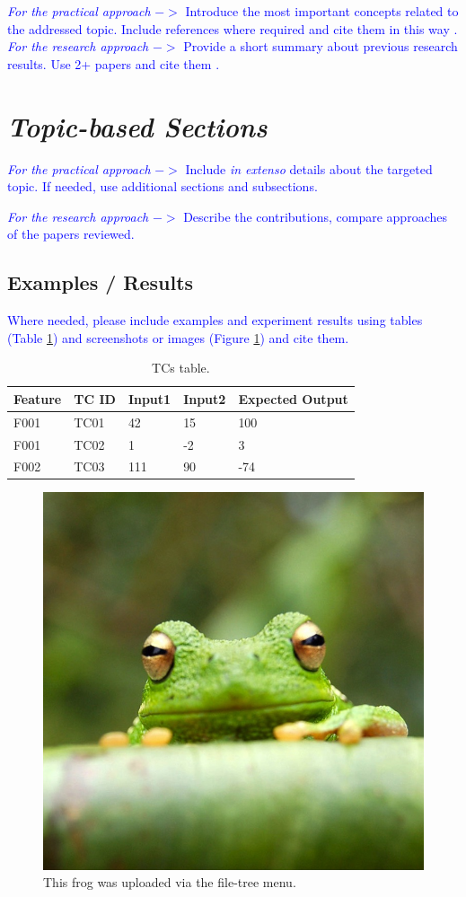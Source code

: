 \documentclass{article}
\begin{document}
\textcolor{blue}{\textit{For the practical approach} $->$ Introduce the most important concepts related to the addressed topic. Include references where required and cite them in this way \cite{greenwade93}.\\
\textit{For the research approach} $->$ Provide a short summary about previous research results. Use 2+ papers and cite them \cite{Vuln001}.
}


\section{\textit{Topic-based Sections}}
\label{label:TopicBasedSection}

\textcolor{blue}{\textit{For the practical approach} $->$ Include \textit{in extenso} details about the targeted topic. If needed, use additional sections and subsections.\\
}

\textcolor{blue}{\textit{For the research approach} $->$
Describe the contributions, compare approaches of the papers reviewed.
}

\subsection{Examples / Results}

\textcolor{blue}{Where needed, please include examples and experiment results using tables (Table \ref{tab:TCs1}) and screenshots or images (Figure \ref {fig:frog}) and cite them. }

\begin{table} [htpb]
\centering
\begin{tabular}{l|l|l|l|l}
Feature & TC ID & Input1 & Input2 & Expected Output \\ \hline
F001  &TC01 & 42 & 15 & 100\\
F001  &TC02 & 1 & -2 & 3\\
F002  &TC03 & 111 & 90 & -74
\end{tabular}
\caption{\label{tab:TCs1}TCs table.}
\end{table}

\begin{figure} [htpb]
\centering
\includegraphics[width=0.25\linewidth]{Figures/frog.jpg}
\caption{\label{fig:frog}This frog was uploaded via the file-tree menu.}
\end{figure}
\end{document}
